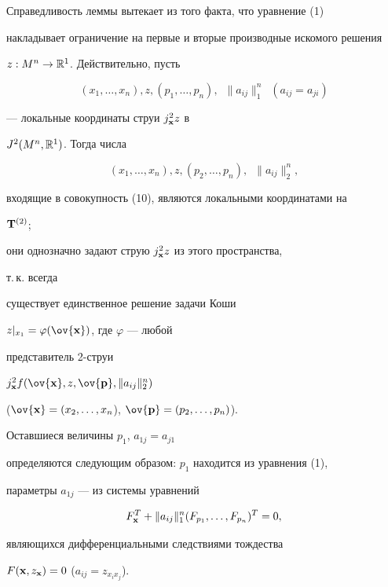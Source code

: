 Справедливость леммы вытекает из того факта, что уравнение (1)


накладывает ограничение на первые и вторые производные искомого решения


$z:M^n\to\Bbb R^1$. Действительно, пусть


\begin{equation}


(x_1,\dotsc,x_n),z,(p_1,\dotsc,p_n), \ \;


\|a_{ij}\|^n_1 \ \; (a_{ij}=a_{ji})


\end{equation}


--- локальные координаты струи $j^2_{\bold x}z$ в


$J^2(M^n,\Bbb R^1)$. Тогда числа


$$


(x_1,\dotsc,x_n),z,(p_2,\dotsc,p_n),\ \; \|a_{ij}\|^n_2,


$$


входящие в совокупность (10), являются локальными координатами на


$\bold T^{(2)}$;


они однозначно задают струю $j^2_{\bold x}z$ из этого пространства,


т.\,к. всегда


существует единственное решение задачи Коши


$z|_{x_1}=\varphi(\ov{\bold x})$, где $\varphi$ --- любой


представитель 2-струи


$j^2_{\bold x}f(\ov{\bold x},z,\ov{\bold p},\|a_{ij}\|^n_2)$


($\ov{\bold x}=(x_2,\dotsc,x_n$), $\ov{\bold p}=(p_2,\dotsc,p_n)$).


Оставшиеся величины $p_1$, $a_{1j}=a_{j1}$


определяются следующим образом: $p_1$ находится из уравнения (1),


параметры $a_{1j}$ --- из системы уравнений


$$


F^T_{\bold x}+\|a_{ij}\|^n_1(F_{p_1},\dotsc,F_{p_n})^T=0,


$$


являющихся дифференциальными следствиями тождества


$F(\bold x,z_{\bold x})=0$ ($a_{ij}=z_{x_i x_j}$).


\medskip





